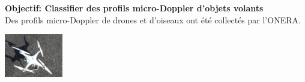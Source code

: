 \documentclass[a0,portrait]{a0poster}
\begin{document}
\begin{multicols}{2} %


\begin{tcolorbox}[colback=blue!5!lime,colframe=green!75!black,title={\section*{Contexte}}]
\textbf{\Large{Objectif: Classifier des profils micro-Doppler d'objets volants}}\\
Des profils micro-Doppler de drones et d'oiseaux ont été collectés par l'ONERA.
\begin{center}
    \includegraphics[width=0.19\textwidth]{./Phantom_version1.jpg}
\end{center}
\end{tcolorbox}
\bigskip



\end{multicols}
\end{document}
